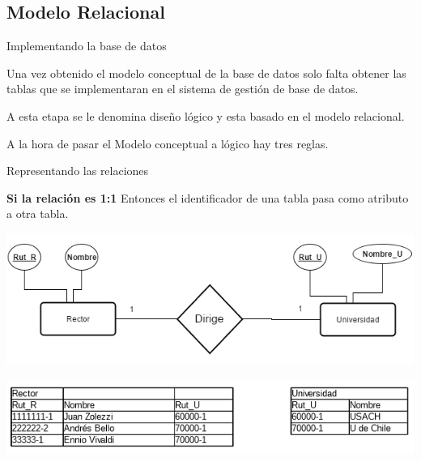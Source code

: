 \documentclass[11pt]{beamer}
\begin{document}
\subsection{Modelo Relacional}

\begin{frame}{Implementando la base de datos}

Una vez obtenido el modelo conceptual de la base de datos solo falta obtener las tablas que se implementaran en el sistema de gestión de base de datos. 

A esta etapa se le denomina diseño lógico y esta basado en el modelo relacional.

A la hora de pasar el Modelo conceptual a lógico hay tres reglas.
\end{frame}


\begin{frame}{Representando las relaciones}



 \textbf{Si la relación es 1:1} Entonces el identificador de una tabla pasa como atributo a otra tabla.

\begin{center}
\includegraphics[scale=.5]{images/11mr.png} 
\end{center}
\begin{center}
\includegraphics[scale=0.7]{images/11mrt.png} 
\end{center}
\end{frame}
\end{document}
